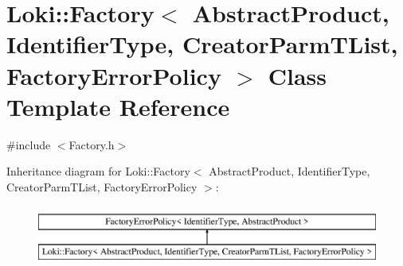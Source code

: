 \hypertarget{classLoki_1_1Factory}{}\section{Loki\+:\+:Factory$<$ Abstract\+Product, Identifier\+Type, Creator\+Parm\+T\+List, Factory\+Error\+Policy $>$ Class Template Reference}
\label{classLoki_1_1Factory}


{\ttfamily \#include $<$Factory.\+h$>$}

Inheritance diagram for Loki\+:\+:Factory$<$ Abstract\+Product, Identifier\+Type, Creator\+Parm\+T\+List, Factory\+Error\+Policy $>$\+:\begin{figure}[H]
\begin{center}
\leavevmode
\includegraphics[height=2.000000cm]{classLoki_1_1Factory}
\end{center}
\end{figure}
